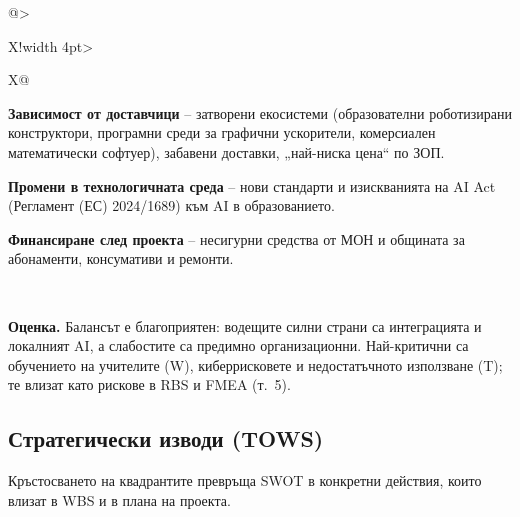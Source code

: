 \documentclass[11pt,a4paper]{article}
\begin{document}
\begin{tabularx}{\textwidth}{@{}>{\raggedright\arraybackslash}X!{\color{white}\vrule width 4pt}>{\raggedright\arraybackslash}X@{}}
\begin{swotlist}
  \item \textbf{Зависимост от доставчици} – затворени екосистеми (образователни роботизирани конструктори, програмни среди за графични ускорители, комерсиален математически софтуер), забавени доставки, „най-ниска цена“ по ЗОП.
  \item \textbf{Промени в технологичната среда} – нови стандарти и изискванията на AI Act (Регламент (ЕС) 2024/1689) към AI в образованието.
  \item \textbf{Финансиране след проекта} – несигурни средства от МОН и общината за абонаменти, консумативи и ремонти.
\end{swotlist}
\\
\end{tabularx}
\endgroup

\smallskip
\textbf{Оценка.} Балансът е благоприятен: водещите силни страни са интеграцията и локалният AI, а слабостите са предимно организационни. Най-критични са обучението на учителите (W), киберрисковете и недостатъчното използване (T); те влизат като рискове в RBS и FMEA (т.~5).

\subsection{Стратегически изводи (TOWS)}

Кръстосването на квадрантите превръща SWOT в конкретни действия, които влизат в WBS и в плана на проекта. 
\end{document}
